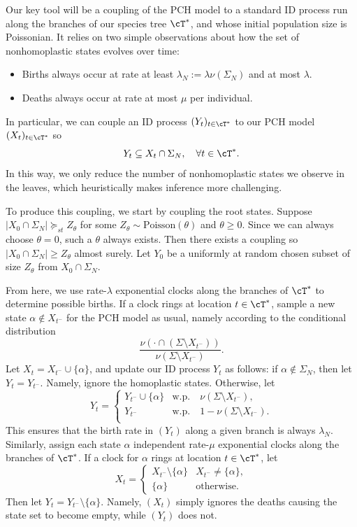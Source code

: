 Our key tool will be a coupling of the PCH model to a standard ID process
 run along the branches of our species tree $\cT^*$, and whose initial population 
 size is Poissonian. It relies on two simple observations
 about how the set of nonhomoplastic states evolves over time:

\begin{itemize}
    \item Births always occur at rate at least $\lambda_N := \lambda \nu(\Sigma_N)$ and at most $\lambda$.

    \item Deaths always occur at rate at most $\mu$ per individual.
\end{itemize}
%
\noindent In particular, we can couple an ID process $(Y_t)_{t \in \cT^*}$ to our PCH model $(X_t)_{t \in \cT^*}$ so
%
\[ Y_t \subseteq X_t \cap \Sigma_N, \quad \forall t \in \cT^*.\]
%
\noindent In this way, we only reduce the number of nonhomoplastic states we observe in the leaves, which heuristically makes inference more challenging.

To produce this coupling, we start by coupling the root states. Suppose
$|X_0 \cap \Sigma_N| \succeq_{st} Z_\theta$ for some
$Z_\theta \sim \mathrm{Poisson}(\theta)$ and $\theta \geq 0$. Since we can
always choose $\theta = 0$, such a $\theta$ always exists. Then there exists a coupling so $|X_0 \cap \Sigma_N| \geq Z_\theta$ 
almost surely. Let $Y_0$ be a uniformly at random chosen subset of size $Z_\theta$ from $X_0 \cap \Sigma_N$.

From here, we use rate-$\lambda$ exponential clocks along the branches of
$\cT^*$ to determine possible births. If a clock rings at location $t \in \cT^*$,
sample a new state $\alpha \notin X_{t^-}$ for the PCH model as usual, namely
according to the conditional distribution
%
\[\frac{\nu(\cdot \cap (\Sigma \setminus X_{t^-}))}{\nu( \Sigma \setminus X_{t^-})}.\]
%
\noindent Let $X_t = X_{t^-} \cup \{\alpha\}$, and update our ID process $Y_t$ as
 follows: if $\alpha \notin \Sigma_N$, then let $Y_t = Y_{t^-}$. Namely, ignore
 the homoplastic states. Otherwise, let
%
\[Y_t = \begin{cases}
    Y_{t^-} \cup \{\alpha\} & \mathrm{w.p.}  \quad \nu(\Sigma \setminus X_{t^-}),\\
    Y_{t^-} & \mathrm{w.p.} \quad 1-\nu(\Sigma \setminus X_{t^-}). \\
\end{cases}\]
%
\noindent This ensures that the birth rate in $(Y_t)$ along a given branch
is always $\lambda_N$. Similarly, assign each state $\alpha$ independent
rate-$\mu$ exponential clocks along the branches of $\cT^*$. If a clock for
$\alpha$ rings at location $t \in \cT^*$, let
%
\[X_t = \begin{cases}
    X_{t^-} \setminus \{\alpha\} & X_{t^-} \neq \{\alpha\},\\
    \{\alpha\} & \mathrm{otherwise}.
\end{cases}\]
%
\noindent Then let $Y_t = Y_{t^-} \setminus \{\alpha\}$. Namely, $(X_t)$ simply ignores the deaths causing the state set to become empty, while $(Y_t)$ does not.

